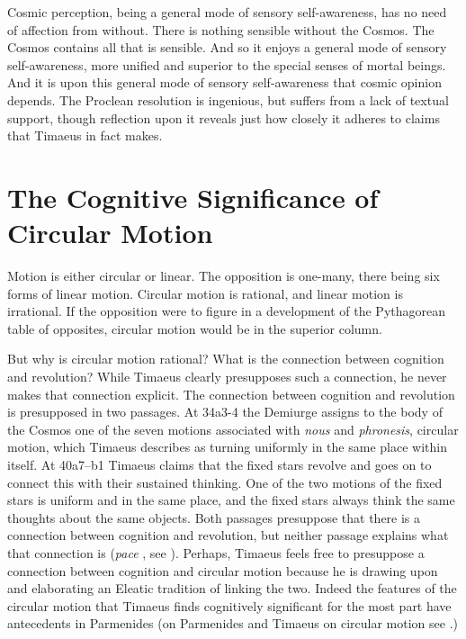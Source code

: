 Cosmic perception, being a general mode of sensory self-awareness, has no need of affection from without. There is nothing sensible without the Cosmos. The Cosmos contains all that is sensible. And so it enjoys a general mode of sensory self-awareness, more unified and superior to the special senses of mortal beings. And it is upon this general mode of sensory self-awareness that cosmic opinion depends. The Proclean resolution is ingenious, but suffers from a lack of textual support, though reflection upon it reveals just how closely it adheres to claims that Timaeus in fact makes.


\section{The Cognitive Significance of Circular Motion} %
\label{sec:the_cognitive_significance_of_circular_motion}

Motion is either circular or linear. The opposition is one-many, there being six forms of linear motion. Circular motion is rational, and linear motion is irrational. If the opposition were to figure in a development of the Pythagorean table of opposites, circular motion would be in the superior column. 

But why is circular motion rational? What is the connection between cognition and revolution? While Timaeus clearly presupposes such a connection, he never makes that connection explicit. The connection between cognition and revolution is presupposed in two passages. At 34a3-4 the Demiurge assigns to the body of the Cosmos one of the seven motions associated with \emph{nous} and \emph{phronesis}, circular motion, which Timaeus describes as turning uniformly in the same place within itself. At 40a7--b1 Timaeus claims that the fixed stars revolve and goes on to connect this with their sustained thinking. One of the two motions of the fixed stars is uniform and in the same place, and the fixed stars always think the same thoughts about the same objects. Both passages presuppose that there is a connection between cognition and revolution, but neither passage explains what that connection is (\emph{pace} \citealt[119]{Cornford:1935fk}, see \citealt[72--3]{Lee:1976xs}). Perhaps, Timaeus feels free to presuppose a connection between cognition and circular motion because he is drawing upon and elaborating an Eleatic tradition of linking the two. Indeed the features of the circular motion that Timaeus finds cognitively significant for the most part have antecedents in Parmenides (on Parmenides and Timaeus on circular motion see \citealt{Ballew:1974hw}.)

